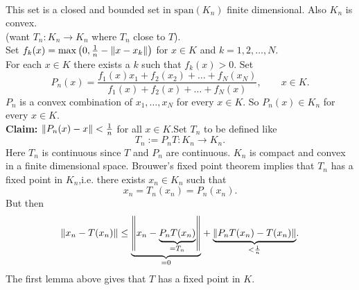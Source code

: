 \begin{description}
\begin{beweis}
\begin{align*}
		\end{align*}
		This set is a closed and bounded set in $\text{span}(K_n)$ finite dimensional. Also $K_n$ is convex.  \\
		(want $T_n: K_n \to K_n$ where $T_n$ close to $T$). \\
		Set $f_k(x)= \max \left(0, \frac{1}{n}- \norm{x-x_k}\right)$ for $x \in K$ and $k=1,2, \dots,N$. \\
		For each $x \in K$ there exists a $k$ such that $f_k(x)>0$. Set
		\[
			P_n(x) = \frac{f_1(x)x_1+f_2(x_2)+ \dots+ f_N(x_N)}{f_1(x)+f_2(x)+ \dots+ f_N(x)}, \qquad x \in K.
		\]
		$P_n$ is a convex combination of $x_1,\dots,x_N$ for every $x \in K$. So $P_n(x) \in K_n$ for every $x \in K$. \\
		\textbf{Claim:} \text{    }     $\norm{P_n(x)-x} < \frac{1}{n}$ for all $x \in K$.Set $T_n$ to be defined like
		\[
			T_n := P_n T : K_n \to K_n.
		\]
		Here $T_n$ is continuous since $T$ and $P_n$ are continuous. $K_n$ is compact and convex in a finite dimensional space. Brouwer's fixed point theorem implies that $T_n$ has a fixed point in $K_n$,i.e. there exists $x_n \in K_n$ such that
		\[
			x_n = T_n(x_n)= P_n(x_n).
		\]
		But then
		\[
			\norm{x_n - T(x_n)} \leq  \underset{=0}{\underbrace{\norm{x_n - \underset{=T_n}{\underbrace{P_nT(x_n)}}}}} + \underset{< \frac{1}{n}}{\underbrace{\norm{ P_nT(x_n)- T(x_n)}}}.
		\]
		The first lemma above gives that $T$ has a fixed point in $K$.
	\end{beweis} 
\end{description}